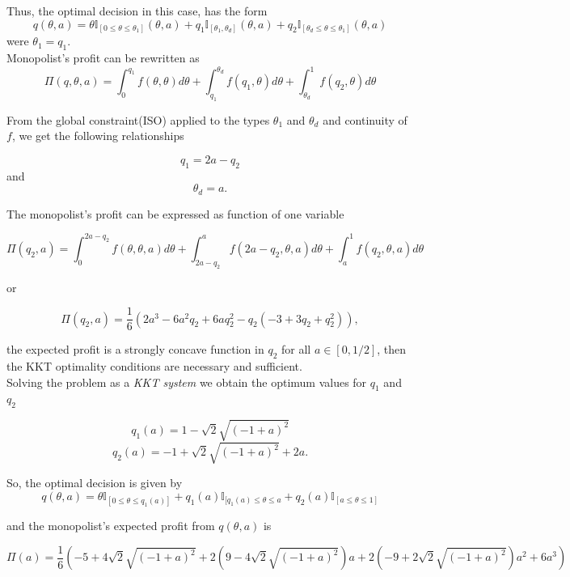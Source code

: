 \begin{itemize}
Thus, the optimal decision in this case, has the form $$q(\theta,a)= \theta \mathbb{I}_{[0 \leq \theta \leq \theta_{1}]}(\theta,a)+ q_1\mathbb{I}_{[\theta_{1},\theta_{d}]}(\theta,a) + q_2\mathbb{I}_{[\theta_{d}\leq \theta \leq \theta_{1}]}(\theta,a) $$
were $\theta_{1}=q_{1}$.\\

Monopolist's profit can be rewritten as 
\begin{equation}
 \Pi(q,\theta,a)=\int_{0}^{q_{1}} f(\theta,\theta)d\theta + \int_{q_{1}}^{\theta_{d}} f(q_{1},\theta)d\theta + \int_{\theta_{d}}^{1} f(q_{2},\theta)d\theta
\end{equation}

From the global constraint(ISO) applied to the types $\theta_{1}$ and $\theta_{d}$ and continuity of $f$, we get the following relationships

 $$q_{1}=2a-q_{2}$$
and
$$\theta_{d}=a.$$

The monopolist's profit can be expressed as function of one  variable  


$$\Pi(q_{2},a)=\int_{0}^{2a-q_{2}} f(\theta,\theta,a) d\theta+ \int_{2a-q_{2}}^{a} f(2a-q_{2},\theta,a) d\theta+ \int_{a}^{1} f(q_2,\theta,a) d\theta$$

or

$$\Pi(q_{2},a)= \dfrac{1}{6} (2a^{3} - 6a^{2}q_{2} + 6 aq_{2}^{2} - q_{2}(-3 + 3q_{2} + q_{2}^{2})),$$

the expected profit  is a strongly concave function in $q_{2}$ for all $a\in [0, 1/2]$, then the KKT optimality conditions are necessary and sufficient.\\


Solving the problem  as a \textit{KKT system} we obtain the optimum values for $q_{1}$ and $q_{2}$ 

$$q_{1}(a)= 1 - \sqrt{2} \sqrt{(-1 + a)^2} $$
$$q_{2}(a)= -1 + \sqrt{2} \sqrt{(-1 + a)^2} + 2 a.$$

So, the optimal decision is given by 
$$q(\theta,a)=\theta \mathbb{I}_{[0\leq \theta \leq q_{1}(a) ]} + q_{1}(a)\mathbb{I}_{[q_{1}(a) \leq \theta \leq a}+ q_{2}(a) \mathbb{I}_{[a \leq \theta \leq 1]}$$


and the monopolist's expected profit from $q(\theta,a)$ is 

$$\Pi(a)=\dfrac{1}{6} (-5 + 4 \sqrt{2} \sqrt{(-1 + a)^2} + 
   2 (9 - 4 \sqrt{2} \sqrt{(-1 + a)^2}) a + 
   2 (-9 + 2 \sqrt{2} \sqrt{(-1 + a)^2}) a^2 + 6 a^3)$$


\end{itemize}
